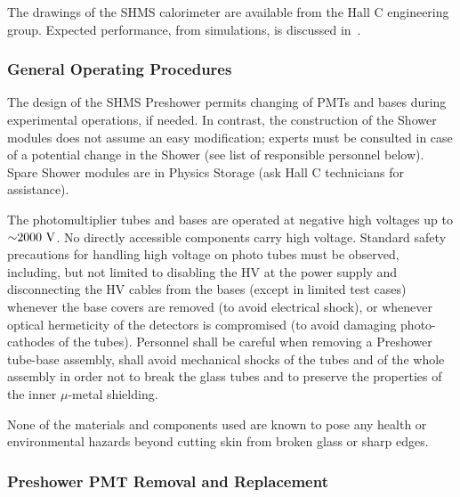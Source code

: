 {The drawings of the SHMS calorimeter are available from the Hall C
engineering group.  Expected performance, from simulations, is discussed
in~\cite{Mkrtchyan201385}.




  
\subsubsection{General Operating Procedures}
The design of the SHMS Preshower permits changing of PMTs and bases during
experimental operations, if needed. In contrast, the construction of the
Shower modules does not assume an easy modification; experts must be
consulted in case of a potential change in the Shower (see list of
responsible personnel below). Spare Shower modules are in Physics
Storage (ask Hall C technicians for assistance).

The photomultiplier tubes and bases are operated at negative high
voltages up to $\mathord{\sim} 2000~\textrm{V}$. No directly accessible
components carry high voltage. Standard safety precautions for
handling high voltage on photo tubes must be observed, including, but
not limited to disabling the HV at the power supply and disconnecting
the HV cables from the bases (except in limited test cases) whenever
the base covers are removed (to avoid electrical shock), or whenever
optical hermeticity of the detectors is compromised (to avoid damaging
photo-cathodes of the tubes). Personnel shall be careful when
removing a Preshower tube-base assembly, shall avoid mechanical shocks
of the tubes and of the whole assembly in order not to break the glass
tubes and to preserve the properties of the inner $\mu$-metal
shielding.

None of the materials and components used are known to pose any health
or environmental hazards beyond cutting skin from broken glass or
sharp edges.

\subsubsection{Preshower PMT Removal and Replacement}
}

